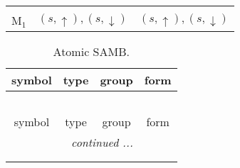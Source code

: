 \documentclass[fleqn,10pt,landscape]{article}
\begin{document}
\begin{itemize}
\begin{center}
\begin{longtable}{c|c|c}
 \hline \hline
\multicolumn{2}{r}{} \\ \endlastfoot

M$_{1}$ & $(s,\uparrow), (s,\downarrow)$ & $(s,\uparrow), (s,\downarrow)$ \\
\end{longtable}
\end{center}
\begin{center}
\renewcommand{\arraystretch}{1.3}
\begin{longtable}{c|c|c|c}
\caption{Atomic SAMB.}
 \\
 \hline \hline
symbol & type & group & form \\ \hline \endfirsthead

\multicolumn{3}{l}{\tablename\ \thetable{}} \\
 \hline \hline
symbol & type & group & form \\ \hline \endhead

 \hline \hline
\multicolumn{3}{r}{\footnotesize\it continued ...} \\ \endfoot

 \hline \hline
\multicolumn{3}{r}{} \\ \endlastfoot


\end{longtable}
\end{center}
\end{itemize}
\end{document}

